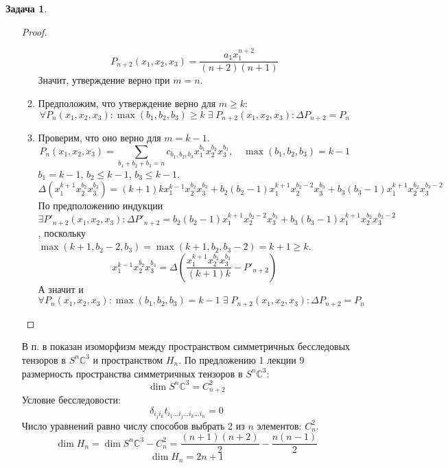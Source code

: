 \documentclass[12pt]{article}
\theoremstyle{definition}
\newtheorem{zad}{Задача}[section]
\begin{document}
\begin{zad}
\begin{itemize}
\begin{proof}
\begin{enumerate}
\begin{equation}
                P_{n+2}(x_1,x_2,x_3)=\frac{a_1x_1^{n+2}}{(n+2)(n+1)}
            \end{equation}
            Значит, утверждение верно при $m=n$.
            \item Предположим, что утверждение верно для $m\geq k$:
            \begin{equation}
                \forall P_n(x_1,x_2,x_3): \max(b_1,b_2,b_3)\geq k \;\exists\; P_{n+2}(x_1,x_2,x_3): \Delta P_{n+2}=P_n
            \end{equation}
            \item Проверим, что оно верно для $m=k-1$.
            \begin{equation}
                P_{n}(x_1,x_2,x_3)=\sum\limits_{b_1+b_2+b_3=n}c_{b_1,b_2,b_3}x_1^{b_1}x_2^{b_2}x_3^{b_3}, \quad \max(b_1,b_2,b_3)=k-1
            \end{equation}
            $b_1=k-1$, $b_2\leq k-1$, $b_3\leq k-1$.
            \begin{equation*}
                \Delta (x_1^{k+1}x_2^{b_2}x_3^{b_3})=(k+1)kx_1^{k-1}x_2^{b_2}x_3^{b_3}+b_2(b_2-1)x_1^{k+1}x_2^{b_2-2}x_3^{b_3}+b_3(b_3-1)x_1^{k+1}x_2^{b_2}x_3^{b_3-2}
            \end{equation*}
            По предположению индукции $\exists P'_{n+2}(x_1,x_2,x_3): \Delta P'_{n+2}=b_2(b_2-1)x_1^{k+1}x_2^{b_2-2}x_3^{b_3}+b_3(b_3-1)x_1^{k+1}x_2^{b_2}x_3^{b_3-2}$, поскольку $\max(k+1,b_2-2,b_3)=\max(k+1,b_2,b_3-2)=k+1\geq k$.
            \begin{equation}
                x_1^{k-1}x_2^{b_2}x_3^{b_3}=\Delta\left(\frac{ x_1^{k+1}x_2^{b_2}x_3^{b_3}}{(k+1)k}-P'_{n+2}\right)
            \end{equation}
            А значит и
            \begin{equation}
                \forall P_n(x_1,x_2,x_3): \max(b_1,b_2,b_3)=k-1 \;\exists\; P_{n+2}(x_1,x_2,x_3): \Delta P_{n+2}=P_n
            \end{equation}
        \end{enumerate}
    \end{proof}
    В п. в показан изоморфизм между пространством симметричных бесследовых тензоров в $S^n\mathbb{C}^3$ и пространством $H_n$. По предложению 1 лекции 9 размерность пространства симметричных тензоров в $S^n\mathbb{C}^3$:
    \begin{equation}
        \dim S^n\mathbb{C}^3=C_{n+2}^2
    \end{equation}
    Условие бесследовости:
    \begin{equation}
        \delta_{i_ji_k}t_{i_1...i_j...i_k...i_n}=0
    \end{equation}
    Число уравнений равно числу способов выбрать 2 из $n$ элементов: $C^2_n$.
    \begin{equation}
        \dim H_n=\dim S^n\mathbb{C}^3-C^2_n=\frac{(n+1)(n+2)}{2}-\frac{n(n-1)}{2}
    \end{equation}
    \begin{equation}
        \boxed{\dim H_n=2n+1}
    \end{equation}
\end{itemize}
\end{zad}
\end{document}

